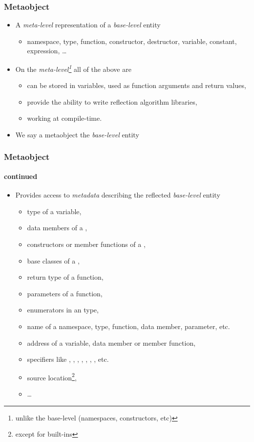 \documentclass[compress,table,xcolor=table]{beamer}
\begin{document}
\begin{frame}
  \frametitle{Metaobject}
  \larger
  \begin{itemize}
    \item A {\em meta-level} representation of a {\em base-level} entity
      \begin{itemize}
      \smaller
        \item namespace, type, function, constructor, destructor, variable,
          constant, expression, \ldots
      \end{itemize}
    \item On the {\em meta-level\footnote{unlike the base-level (namespaces,
      constructors, etc)}} all
      of the above are 
      \begin{itemize}
      \smaller
        \item can be stored in variables, used as function arguments and
          return values,
        \item provide the ability to write reflection algorithm libraries,
        \item working at compile-time.
      \end{itemize}
    \item We say a metaobject  the {\em base-level} entity
  \end{itemize}
\end{frame}
\begin{frame}
  \frametitle{Metaobject}
  \framesubtitle{continued}
  \larger
  \begin{itemize}
    \item Provides access to {\em metadata} describing the reflected
      {\em base-level} entity
      \begin{itemize}
      \smaller
        \item type of a variable,
        \item data members of a ,
        \item constructors or member functions of a ,
        \item base classes of a ,
        \item return type of a function,
        \item parameters of a function,
        \item enumerators in an  type,
        \item name of a namespace, type, function, data member, parameter, etc.
        \item address of a variable, data member or member function,
        \item specifiers like , ,
          , , ,
          , , etc.
        \item source location\footnote{except for built-ins},
        \item \ldots
      \end{itemize}
  \end{itemize}
\end{frame}
\end{document}
